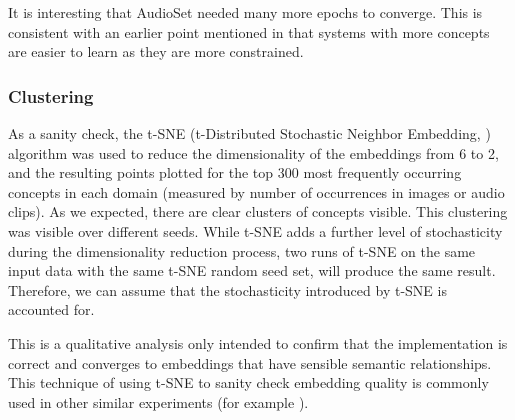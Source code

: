 It is interesting that AudioSet needed many more epochs to converge. This is consistent with an earlier point mentioned in \cite{GOLDSTONE2002295} that systems with more concepts are easier to learn as they are more constrained. 

\subsubsection{Clustering}
As a sanity check, the t-SNE (t-Distributed Stochastic Neighbor Embedding, \cite{tsne}) algorithm was  used to reduce the dimensionality of the embeddings from 6 to 2, and the resulting points plotted for the top 300 most frequently occurring concepts in each domain (measured by number of occurrences in images or audio clips). As we expected, there are clear clusters of concepts visible. This clustering was visible over different seeds. While t-SNE adds a further level of stochasticity during the dimensionality reduction process, two runs of t-SNE on the same input data with the same t-SNE random seed set, will produce the same result. Therefore, we can assume that the stochasticity introduced by t-SNE is accounted for. 

This is a qualitative analysis only intended to confirm that the implementation is correct and converges to embeddings that have sensible semantic relationships. This technique of using t-SNE to sanity check embedding quality is commonly used in other similar experiments (for example \cite{CoocurrenceVisionLanguage2021}). 

